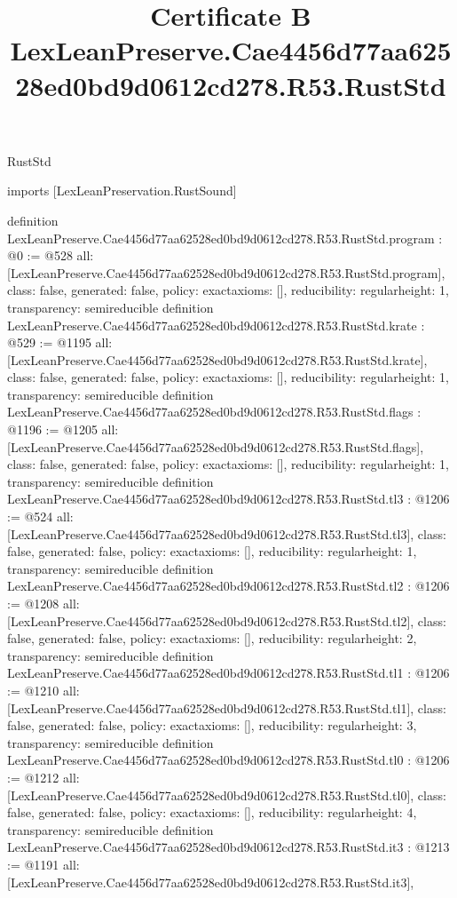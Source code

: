 \begin{lexlean}{RustStd}
\title{Certificate B LexLeanPreserve.Cae4456d77aa62528ed0bd9d0612cd278.R53.RustStd}
\begin{coremodule}
imports [LexLeanPreservation.RustSound]

definition LexLeanPreserve.Cae4456d77aa62528ed0bd9d0612cd278.R53.RustStd.program : @0 := @528 {
  all: [LexLeanPreserve.Cae4456d77aa62528ed0bd9d0612cd278.R53.RustStd.program],
  class: false,
  generated: false,
  policy: exact{axioms: []},
  reducibility: regular{height: 1},
  transparency: semireducible
}
definition LexLeanPreserve.Cae4456d77aa62528ed0bd9d0612cd278.R53.RustStd.krate : @529 := @1195 {
  all: [LexLeanPreserve.Cae4456d77aa62528ed0bd9d0612cd278.R53.RustStd.krate],
  class: false,
  generated: false,
  policy: exact{axioms: []},
  reducibility: regular{height: 1},
  transparency: semireducible
}
definition LexLeanPreserve.Cae4456d77aa62528ed0bd9d0612cd278.R53.RustStd.flags : @1196 := @1205 {
  all: [LexLeanPreserve.Cae4456d77aa62528ed0bd9d0612cd278.R53.RustStd.flags],
  class: false,
  generated: false,
  policy: exact{axioms: []},
  reducibility: regular{height: 1},
  transparency: semireducible
}
definition LexLeanPreserve.Cae4456d77aa62528ed0bd9d0612cd278.R53.RustStd.tl3 : @1206 := @524 {
  all: [LexLeanPreserve.Cae4456d77aa62528ed0bd9d0612cd278.R53.RustStd.tl3],
  class: false,
  generated: false,
  policy: exact{axioms: []},
  reducibility: regular{height: 1},
  transparency: semireducible
}
definition LexLeanPreserve.Cae4456d77aa62528ed0bd9d0612cd278.R53.RustStd.tl2 : @1206 := @1208 {
  all: [LexLeanPreserve.Cae4456d77aa62528ed0bd9d0612cd278.R53.RustStd.tl2],
  class: false,
  generated: false,
  policy: exact{axioms: []},
  reducibility: regular{height: 2},
  transparency: semireducible
}
definition LexLeanPreserve.Cae4456d77aa62528ed0bd9d0612cd278.R53.RustStd.tl1 : @1206 := @1210 {
  all: [LexLeanPreserve.Cae4456d77aa62528ed0bd9d0612cd278.R53.RustStd.tl1],
  class: false,
  generated: false,
  policy: exact{axioms: []},
  reducibility: regular{height: 3},
  transparency: semireducible
}
definition LexLeanPreserve.Cae4456d77aa62528ed0bd9d0612cd278.R53.RustStd.tl0 : @1206 := @1212 {
  all: [LexLeanPreserve.Cae4456d77aa62528ed0bd9d0612cd278.R53.RustStd.tl0],
  class: false,
  generated: false,
  policy: exact{axioms: []},
  reducibility: regular{height: 4},
  transparency: semireducible
}
definition LexLeanPreserve.Cae4456d77aa62528ed0bd9d0612cd278.R53.RustStd.it3 : @1213 := @1191 {
  all: [LexLeanPreserve.Cae4456d77aa62528ed0bd9d0612cd278.R53.RustStd.it3],
}
\end{coremodule}
\end{lexlean}
